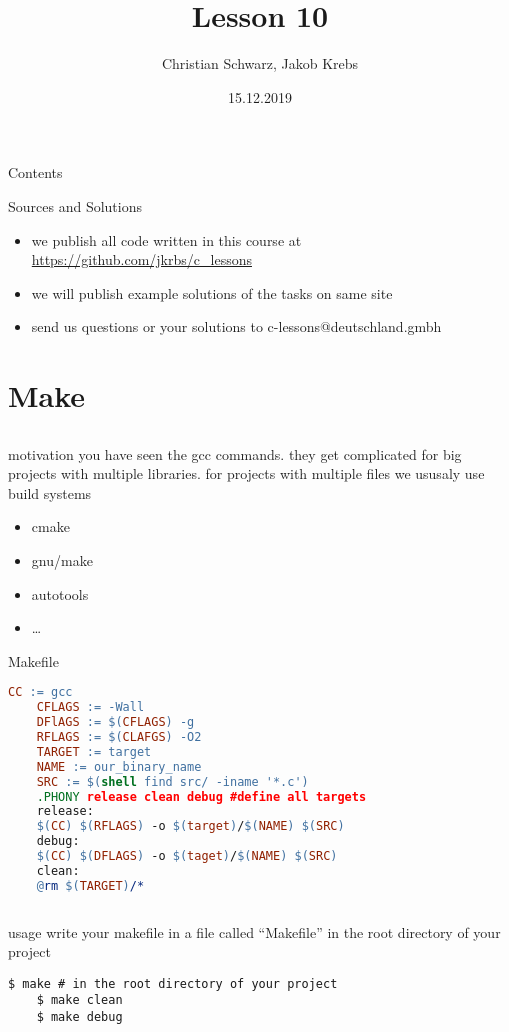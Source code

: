 \documentclass[10pt,graphics,aspectratio=169,table]{beamer}
\title{Lesson 10}
\author{Christian Schwarz, Jakob Krebs}
\date{15.12.2019}
\begin{document}
\maketitle

\begin{frame}{Contents}
    \tableofcontents
\end{frame}

\begin{frame}{Sources and Solutions}
    \begin{itemize}
        \item we publish all code written in this course at \url{https://github.com/jkrbs/c_lessons}
        \item we will publish example solutions of the tasks on same site
        \item send us questions or your solutions to c-lessons@deutschland.gmbh
    \end{itemize}
\end{frame}



\section{Make}
\subsection{}

\begin{frame}{motivation}
  you have seen the gcc commands.
  \bigskip
  they get complicated for big projects with multiple libraries.
\bigskip
for projects with multiple files we ususaly use build systems  
\begin{itemize}
    \item cmake
    \item gnu/make
    \item autotools
    \item \ldots
  \end{itemize}
\end{frame}

\begin{frame}[fragile]{Makefile}
    \begin{lstlisting}[language=make]
    CC := gcc
    CFLAGS := -Wall
    DFlAGS := $(CFLAGS) -g
    RFLAGS := $(CLAFGS) -O2
    TARGET := target
    NAME := our_binary_name
    SRC := $(shell find src/ -iname '*.c')
    .PHONY release clean debug #define all targets 
    release: 
    $(CC) $(RFLAGS) -o $(target)/$(NAME) $(SRC)
    debug:
    $(CC) $(DFLAGS) -o $(taget)/$(NAME) $(SRC)
    clean:
    @rm $(TARGET)/*
    
  \end{lstlisting}
\end{frame}

\begin{frame}[fragile]{usage}
  write your makefile in a file called \enquote{Makefile} in the root directory
  of your project
  
    \begin{lstlisting}[numbers=none]
    $ make # in the root directory of your project
    $ make clean
    $ make debug
  \end{lstlisting}
  
\end{frame}
\end{document}
